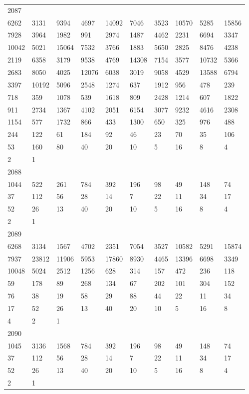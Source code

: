 \begin{longtable}{*{10}{l}}
2087&&&&&&&&&\\
6262& 3131& 9394& 4697& 14092& 7046& 3523& 10570& 5285& 15856\\
7928& 3964& 1982& 991& 2974& 1487& 4462& 2231& 6694& 3347\\
10042& 5021& 15064& 7532& 3766& 1883& 5650& 2825& 8476& 4238\\
2119& 6358& 3179& 9538& 4769& 14308& 7154& 3577& 10732& 5366\\
2683& 8050& 4025& 12076& 6038& 3019& 9058& 4529& 13588& 6794\\
3397& 10192& 5096& 2548& 1274& 637& 1912& 956& 478& 239\\
718& 359& 1078& 539& 1618& 809& 2428& 1214& 607& 1822\\
911& 2734& 1367& 4102& 2051& 6154& 3077& 9232& 4616& 2308\\
1154& 577& 1732& 866& 433& 1300& 650& 325& 976& 488\\
244& 122& 61& 184& 92& 46& 23& 70& 35& 106\\
53& 160& 80& 40& 20& 10& 5& 16& 8& 4\\
2& 1& \\

2088&&&&&&&&&\\
1044& 522& 261& 784& 392& 196& 98& 49& 148& 74\\
37& 112& 56& 28& 14& 7& 22& 11& 34& 17\\
52& 26& 13& 40& 20& 10& 5& 16& 8& 4\\
2& 1& \\

2089&&&&&&&&&\\
6268& 3134& 1567& 4702& 2351& 7054& 3527& 10582& 5291& 15874\\
7937& 23812& 11906& 5953& 17860& 8930& 4465& 13396& 6698& 3349\\
10048& 5024& 2512& 1256& 628& 314& 157& 472& 236& 118\\
59& 178& 89& 268& 134& 67& 202& 101& 304& 152\\
76& 38& 19& 58& 29& 88& 44& 22& 11& 34\\
17& 52& 26& 13& 40& 20& 10& 5& 16& 8\\
4& 2& 1& \\

2090&&&&&&&&&\\
1045& 3136& 1568& 784& 392& 196& 98& 49& 148& 74\\
37& 112& 56& 28& 14& 7& 22& 11& 34& 17\\
52& 26& 13& 40& 20& 10& 5& 16& 8& 4\\
2& 1& \\


\end{longtable}

